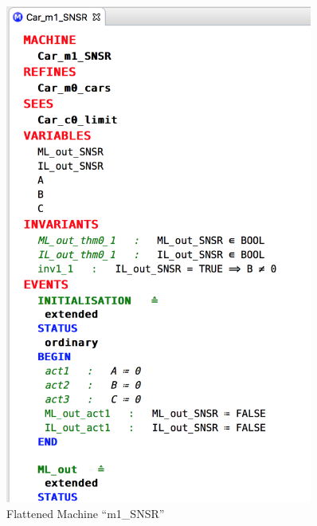 \begin{figure}[!htbp]
	\includegraphics[width=0.9\textwidth]{figures/Flattened_var_m1_snsr}
	\fi
	\caption{Flattened Machine ``m1\_SNSR''}
	\label{fig:FlattenedMachine}
\end{figure}


